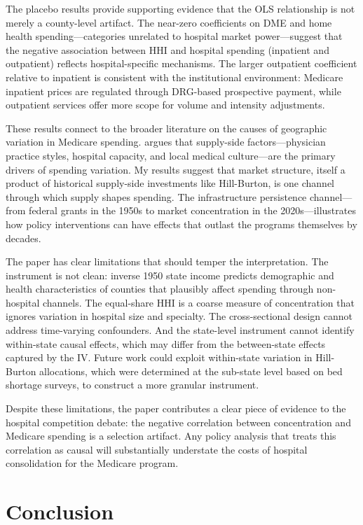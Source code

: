 \documentclass[12pt]{article}
\begin{document}
The placebo results provide supporting evidence that the OLS relationship is not merely a county-level artifact. The near-zero coefficients on DME and home health spending---categories unrelated to hospital market power---suggest that the negative association between HHI and hospital spending (inpatient and outpatient) reflects hospital-specific mechanisms. The larger outpatient coefficient relative to inpatient is consistent with the institutional environment: Medicare inpatient prices are regulated through DRG-based prospective payment, while outpatient services offer more scope for volume and intensity adjustments.

These results connect to the broader literature on the causes of geographic variation in Medicare spending. \citet{skinner2011causes} argues that supply-side factors---physician practice styles, hospital capacity, and local medical culture---are the primary drivers of spending variation. My results suggest that market structure, itself a product of historical supply-side investments like Hill-Burton, is one channel through which supply shapes spending. The infrastructure persistence channel---from federal grants in the 1950s to market concentration in the 2020s---illustrates how policy interventions can have effects that outlast the programs themselves by decades.

The paper has clear limitations that should temper the interpretation. The instrument is not clean: inverse 1950 state income predicts demographic and health characteristics of counties that plausibly affect spending through non-hospital channels. The equal-share HHI is a coarse measure of concentration that ignores variation in hospital size and specialty. The cross-sectional design cannot address time-varying confounders. And the state-level instrument cannot identify within-state causal effects, which may differ from the between-state effects captured by the IV. Future work could exploit within-state variation in Hill-Burton allocations, which were determined at the sub-state level based on bed shortage surveys, to construct a more granular instrument.

Despite these limitations, the paper contributes a clear piece of evidence to the hospital competition debate: the negative correlation between concentration and Medicare spending is a selection artifact. Any policy analysis that treats this correlation as causal will substantially understate the costs of hospital consolidation for the Medicare program.


\section{Conclusion}
\end{document}
